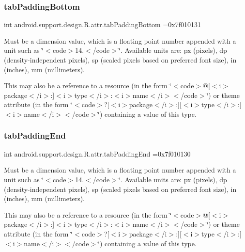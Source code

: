 \subsubsection{\texorpdfstring{tab\+Padding\+Bottom}{tabPaddingBottom}}
{\footnotesize\ttfamily int android.\+support.\+design.\+R.\+attr.\+tab\+Padding\+Bottom =0x7f010131\hspace{0.3cm}{\ttfamily [static]}}

Must be a dimension value, which is a floating point number appended with a unit such as \char`\"{}$<$code$>$14.\+5sp$<$/code$>$\char`\"{}. Available units are\+: px (pixels), dp (density-\/independent pixels), sp (scaled pixels based on preferred font size), in (inches), mm (millimeters). 

This may also be a reference to a resource (in the form \char`\"{}$<$code$>$@\mbox{[}$<$i$>$package$<$/i$>$\+:\mbox{]}$<$i$>$type$<$/i$>$\+:$<$i$>$name$<$/i$>$$<$/code$>$\char`\"{}) or theme attribute (in the form \char`\"{}$<$code$>$?\mbox{[}$<$i$>$package$<$/i$>$\+:\mbox{]}\mbox{[}$<$i$>$type$<$/i$>$\+:\mbox{]}$<$i$>$name$<$/i$>$$<$/code$>$\char`\"{}) containing a value of this type. \mbox{\label{classandroid_1_1support_1_1design_1_1R_1_1attr_a0c324f3c1cbd6bf57bac7ae27b2c4d0b}} 
\subsubsection{\texorpdfstring{tab\+Padding\+End}{tabPaddingEnd}}
{\footnotesize\ttfamily int android.\+support.\+design.\+R.\+attr.\+tab\+Padding\+End =0x7f010130\hspace{0.3cm}{\ttfamily [static]}}

Must be a dimension value, which is a floating point number appended with a unit such as \char`\"{}$<$code$>$14.\+5sp$<$/code$>$\char`\"{}. Available units are\+: px (pixels), dp (density-\/independent pixels), sp (scaled pixels based on preferred font size), in (inches), mm (millimeters). 

This may also be a reference to a resource (in the form \char`\"{}$<$code$>$@\mbox{[}$<$i$>$package$<$/i$>$\+:\mbox{]}$<$i$>$type$<$/i$>$\+:$<$i$>$name$<$/i$>$$<$/code$>$\char`\"{}) or theme attribute (in the form \char`\"{}$<$code$>$?\mbox{[}$<$i$>$package$<$/i$>$\+:\mbox{]}\mbox{[}$<$i$>$type$<$/i$>$\+:\mbox{]}$<$i$>$name$<$/i$>$$<$/code$>$\char`\"{}) containing a value of this type. \mbox{\label{classandroid_1_1support_1_1design_1_1R_1_1attr_aff6098bfa08bb8d7dbaafe9d1ef8feb6}} 
